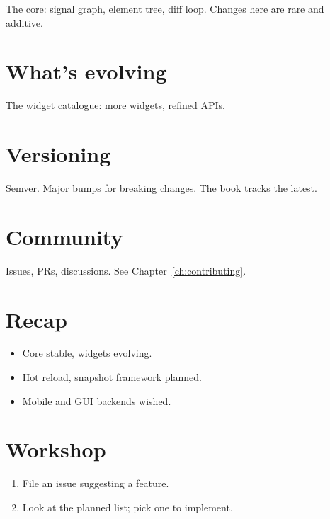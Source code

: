 The core: signal graph, element tree, diff loop. Changes
here are rare and additive.

\section{What's evolving}

The widget catalogue: more widgets, refined APIs.

\section{Versioning}

Semver. Major bumps for breaking changes. The book tracks
the latest.

\section{Community}

Issues, PRs, discussions. See Chapter~\ref{ch:contributing}.

\section{Recap}

\begin{recap}
\begin{itemize}[leftmargin=*]
  \item Core stable, widgets evolving.
  \item Hot reload, snapshot framework planned.
  \item Mobile and GUI backends wished.
\end{itemize}
\end{recap}

\section*{Workshop}

\begin{enumerate}[leftmargin=*]
  \item File an issue suggesting a feature.
  \item Look at the planned list; pick one to implement.
\end{enumerate}

